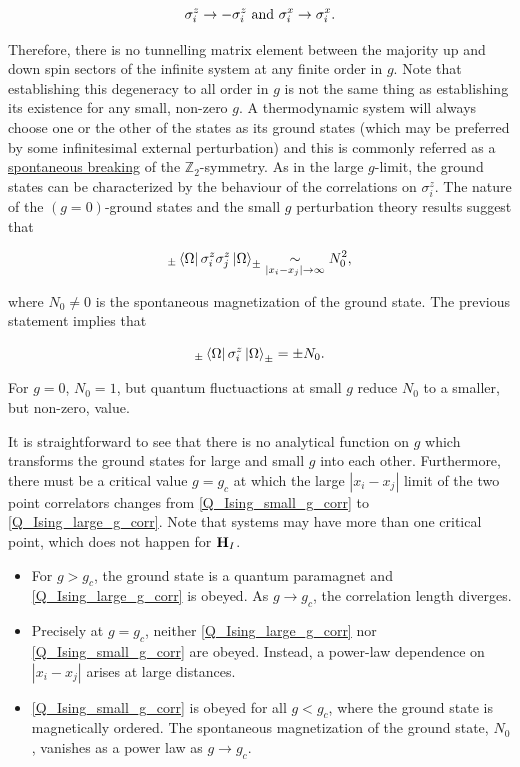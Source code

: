 \documentclass{homework}
\begin{document}
\begin{itemize}
    $$
        \sigma_{i}^z \rightarrow  -\sigma_{i}^z \textnormal{ and }  \sigma_{i}^x \rightarrow \sigma_{i}^x.
    $$
    
    Therefore, there is no tunnelling matrix element between the majority up and down spin sectors of the infinite system at any finite order in $g$. Note that establishing this degeneracy to all order in $g$ is not the same thing as establishing its existence for any small, non-zero $g$. A thermodynamic system will always choose one or the other of the states as its ground states (which may be preferred by some infinitesimal external perturbation) and this is commonly referred as a \underline{spontaneous breaking} of the $\mathds{Z}_2$-symmetry. As in the large $g$-limit, the ground states can be characterized by the behaviour of the correlations on $\sigma_i^z$.
    The nature of the $(g=0)$-ground states and the small $g$ perturbation theory results suggest that 
    
    \begin{equation}
        _{\pm}\bra{\Omega}\sigma_i^z \sigma_j^z\ket{\Omega}_{\pm} \underset{|x_i - x_j| \rightarrow \infty}{\sim} N_0^2,
        \label{Q_Ising_small_g_corr}
    \end{equation}
    
    where $N_0 \neq 0$ is the spontaneous magnetization of the ground state. The previous statement implies that 
    
    $$
        _{\pm}\bra{\Omega}\sigma_i^z \ket{\Omega}_{\pm} = \pm N_0.
    $$
    
    For $g=0$, $N_0 = 1$, but quantum fluctuactions at small $g$  reduce $N_0$ to a smaller, but non-zero, value. \\
\end{itemize}

It is straightforward to see that there is no analytical function on $g$ which transforms the ground states for large and small $g$ into each other. Furthermore, there must be a critical value $g = g_c$ at which the large $|x_i - x_j|$ limit of the two point correlators changes from \cref{Q_Ising_small_g_corr} to \cref{Q_Ising_large_g_corr}. Note that systems may have more than one critical point, which does not happen for ${\bf H}_I$. 

\begin{itemize}
    \item For $g > g_c$, the ground state is a quantum paramagnet and \cref{Q_Ising_large_g_corr} is obeyed. As $g \rightarrow g_c$, the correlation length diverges. \\
    \item Precisely at $g = g_c$, neither \cref{Q_Ising_large_g_corr} nor \cref{Q_Ising_small_g_corr} are obeyed. Instead, a power-law dependence on $|x_i - x_j|$ arises at large distances. \\
    \item \cref{Q_Ising_small_g_corr} is obeyed for all $g < g_c$, where the ground state is magnetically ordered. The spontaneous magnetization of the ground state, $N_0$, vanishes as a power law as $g \rightarrow g_c$. \\
\end{itemize}
\end{document}
